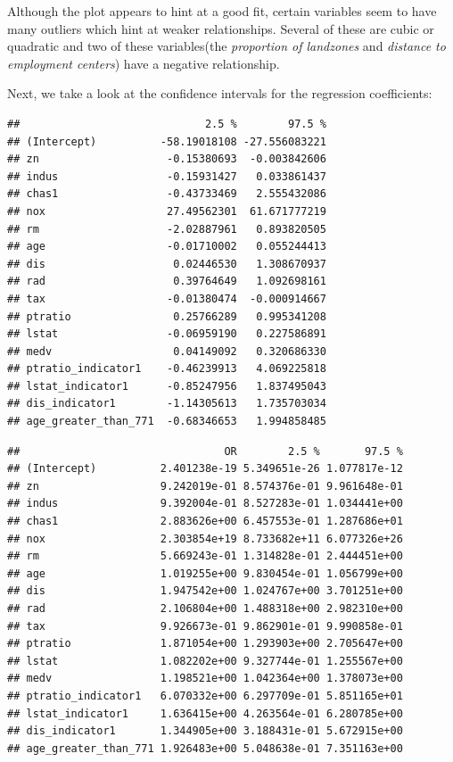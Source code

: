 \documentclass[3p]{elsarticle} %
\begin{document}
Although the plot appears to hint at a good fit, certain variables seem
to have many outliers which hint at weaker relationships. Several of
these are cubic or quadratic and two of these variables(the
\emph{proportion of landzones} and \emph{distance to employment
centers}) have a negative relationship.

Next, we take a look at the confidence intervals for the regression
coefficients:

\begin{verbatim}
##                             2.5 %        97.5 %
## (Intercept)          -58.19018108 -27.556083221
## zn                    -0.15380693  -0.003842606
## indus                 -0.15931427   0.033861437
## chas1                 -0.43733469   2.555432086
## nox                   27.49562301  61.671777219
## rm                    -2.02887961   0.893820505
## age                   -0.01710002   0.055244413
## dis                    0.02446530   1.308670937
## rad                    0.39764649   1.092698161
## tax                   -0.01380474  -0.000914667
## ptratio                0.25766289   0.995341208
## lstat                 -0.06959190   0.227586891
## medv                   0.04149092   0.320686330
## ptratio_indicator1    -0.46239913   4.069225818
## lstat_indicator1      -0.85247956   1.837495043
## dis_indicator1        -1.14305613   1.735703034
## age_greater_than_771  -0.68346653   1.994858485
\end{verbatim}

\begin{verbatim}
##                                OR        2.5 %       97.5 %
## (Intercept)          2.401238e-19 5.349651e-26 1.077817e-12
## zn                   9.242019e-01 8.574376e-01 9.961648e-01
## indus                9.392004e-01 8.527283e-01 1.034441e+00
## chas1                2.883626e+00 6.457553e-01 1.287686e+01
## nox                  2.303854e+19 8.733682e+11 6.077326e+26
## rm                   5.669243e-01 1.314828e-01 2.444451e+00
## age                  1.019255e+00 9.830454e-01 1.056799e+00
## dis                  1.947542e+00 1.024767e+00 3.701251e+00
## rad                  2.106804e+00 1.488318e+00 2.982310e+00
## tax                  9.926673e-01 9.862901e-01 9.990858e-01
## ptratio              1.871054e+00 1.293903e+00 2.705647e+00
## lstat                1.082202e+00 9.327744e-01 1.255567e+00
## medv                 1.198521e+00 1.042364e+00 1.378073e+00
## ptratio_indicator1   6.070332e+00 6.297709e-01 5.851165e+01
## lstat_indicator1     1.636415e+00 4.263564e-01 6.280785e+00
## dis_indicator1       1.344905e+00 3.188431e-01 5.672915e+00
## age_greater_than_771 1.926483e+00 5.048638e-01 7.351163e+00
\end{verbatim}
\end{document}
